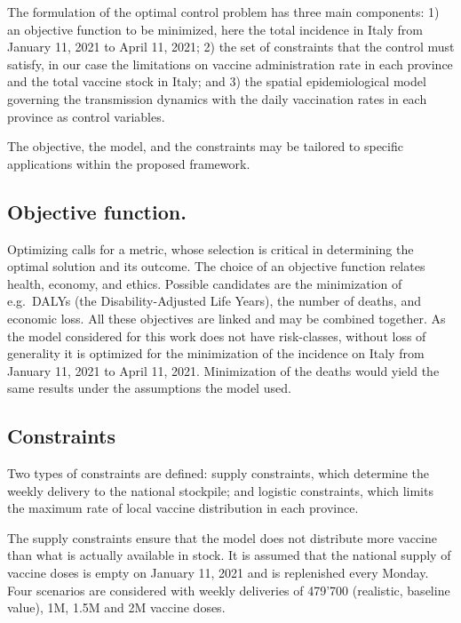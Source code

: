 The formulation of the optimal control problem has three main components: 1) an objective function to be minimized, here the total incidence in Italy from January 11, 2021 to April 11, 2021; 2) the set of constraints that the control must satisfy, in our case the limitations on vaccine administration rate in each province and the total vaccine stock in Italy; and 3) the spatial epidemiological model\cite{Gatto:SpreadDynamicsCOVID19:2020, Bertuzzo:GeographyCOVID19Spread:2020} governing the transmission dynamics with the daily vaccination rates in each province as control variables.

The objective, the model, and the constraints may be tailored to specific applications within the proposed framework.

\subsection{Objective function.} Optimizing calls for a metric, whose selection is critical in determining the optimal solution and its outcome. The choice of an objective function relates health, economy, and ethics. Possible candidates are the minimization of e.g.~DALYs (the Disability-Adjusted Life Years), the number of deaths, and economic loss\cite{Du:ComparativeCosteffectivenessSARSCoV2:2021}. All these objectives are linked and may be combined together. As the model considered for this work does not have risk-classes, without loss of generality it is optimized for the minimization of the incidence on Italy from January 11, 2021 to April 11, 2021. Minimization of the deaths would yield the same results under the assumptions the model used.

\subsection{Constraints} Two types of constraints are defined: supply constraints, which determine the weekly delivery to the national stockpile; and logistic constraints, which limits the maximum rate of local vaccine distribution in each province.

The supply constraints ensure that the model does not distribute more vaccine than what is actually available in stock. It is assumed that the national supply of vaccine doses is empty on January 11, 2021 and is replenished every Monday. Four scenarios are considered with weekly deliveries of 479'700 (realistic, baseline value), 1M, 1.5M and 2M vaccine doses.

